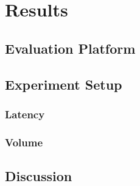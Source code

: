 
\section{Results} %
\subsection{Evaluation Platform} %
\subsection{Experiment Setup} %
\subsubsection{Latency} %
\subsubsection{Volume} %
\subsection{Discussion} %


